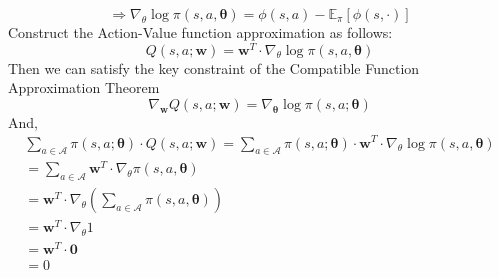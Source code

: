 \documentclass{article}
\begin{document}
$$
\Longrightarrow
\nabla_{\theta} \log \pi(s, a, \boldsymbol\theta)=\phi(s, a)-\mathbb{E}_{\pi}[\phi(s, \cdot)]
$$
Construct the Action-Value function approximation as follows:\\
$$
Q(s, a ; \boldsymbol{w})=\boldsymbol{w}^{T} \cdot \nabla_{\theta} \log \pi(s, a, \boldsymbol{\theta})
$$
Then we can satisfy the key constraint of the Compatible Function Approximation Theorem\\
$$
\nabla_{\boldsymbol{w}} Q(s, a ; \boldsymbol{w})=\nabla_{\boldsymbol{\theta}} \log \pi(s, a ; \boldsymbol{\theta})
$$
And,
$$
\begin{gathered}
\sum_{a \in \mathcal{A}} \pi (s,a  ; \boldsymbol{\theta}) \cdot Q(s, a ; \boldsymbol{w})=\sum_{a \in \mathcal{A}} \pi(s ,a ; \boldsymbol{\theta}) \cdot \boldsymbol{w}^{T} \cdot \nabla_{\theta} \log \pi(s , a, \boldsymbol{\theta}) \\
=\sum_{a \in \mathcal{A}} \boldsymbol{w}^{T} \cdot \nabla_{\theta} \pi(s, a, \boldsymbol{\theta}) \\
=\boldsymbol{w}^{T} \cdot \nabla_{\theta}\left(\sum_{a \in \mathcal{A}} \pi(s ,a, \boldsymbol \theta)\right) \\
=\boldsymbol{w}^{T} \cdot \nabla_{\theta} 1 \\
= \boldsymbol{w}^{T} \cdot \boldsymbol 0\\
=0
\end{gathered}
$$
\end{document}
